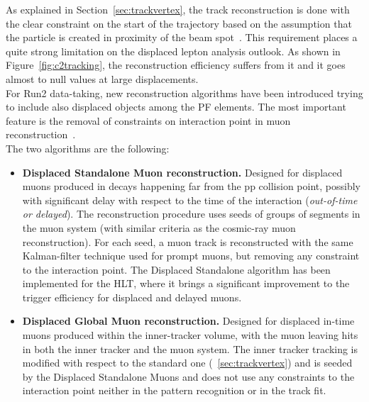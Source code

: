 As explained in Section~\ref{sec:trackvertex}, the track
reconstruction is done with the clear 
constraint on the start of the trajectory based on the assumption that the
particle is created in proximity of the beam
spot~\cite{Collaboration_2014_tracking}. This requirement places a
quite strong limitation on the displaced lepton analysis outlook. As
shown in Figure~\ref{fig:c2tracking}, the reconstruction efficiency
suffers from it and it goes almost to null values at large
displacements. \\
For Run2 data-taking, new reconstruction algorithms have been
introduced trying to include also displaced objects among
the PF elements. The most important feature is the removal of constraints on interaction point in muon reconstruction~\cite{CMS-DP-2015-015, steven_slide}.\\
The two algorithms are the following:
\begin{itemize}
\setlength\itemsep{-0.2em}
\item \textbf{Displaced Standalone Muon reconstruction.} Designed for
  displaced muons produced in decays happening far from the pp
  collision point, possibly with significant delay with respect to the time of the
  interaction (\emph{out-of-time or delayed}). The reconstruction
  procedure uses seeds of groups of segments in the muon system
  (with similar criteria as the cosmic-ray muon reconstruction). For
  each seed, a muon track is reconstructed with the same Kalman-filter
  technique used for prompt muons, but removing any constraint to the
  interaction point. The Displaced Standalone algorithm has been implemented for the HLT,
  where it brings a significant improvement to the trigger efficiency for displaced and delayed
  muons.
\item \textbf{Displaced Global Muon reconstruction.} Designed for displaced in-time muons produced within the inner-tracker volume, with the
  muon leaving hits in both the inner tracker and the muon system. The
  inner tracker tracking is modified with respect to the standard one
  (~\ref{sec:trackvertex}) and is seeded by the Displaced Standalone Muons and does
  not use any constraints to the interaction point neither in the pattern recognition or in the track fit.
\end{itemize}

